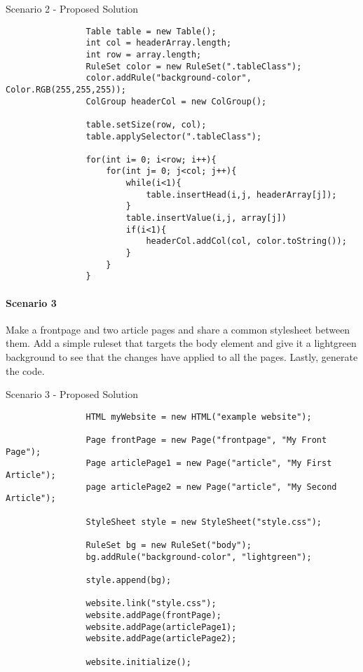 \documentclass[12pt]{article}
\begin{document}
        \begin{shaded}
            Scenario 2 - Proposed Solution
            \begin{lstlisting}
                Table table = new Table();
                int col = headerArray.length;
                int row = array.length;
                RuleSet color = new RuleSet(".tableClass");
                color.addRule("background-color", Color.RGB(255,255,255));
                ColGroup headerCol = new ColGroup();

                table.setSize(row, col);
                table.applySelector(".tableClass");

                for(int i= 0; i<row; i++){
                    for(int j= 0; j<col; j++){
                        while(i<1){
                            table.insertHead(i,j, headerArray[j]);
                        }
                        table.insertValue(i,j, array[j])
                        if(i<1){
                            headerCol.addCol(col, color.toString());
                        }
                    }
                }
            \end{lstlisting}
        \end{shaded}

        \paragraph{Scenario 3}
        Make a frontpage and two article pages and share a common stylesheet between them. Add a simple ruleset that targets the body element and give it a lightgreen background to see that the changes have applied to all the pages. Lastly, generate the code.

        \begin{shaded}
            Scenario 3 - Proposed Solution
            \begin{lstlisting}
                HTML myWebsite = new HTML("example website");
                
                Page frontPage = new Page("frontpage", "My Front Page");
                Page articlePage1 = new Page("article", "My First Article");
                page articlePage2 = new Page("article", "My Second Article");

                StyleSheet style = new StyleSheet("style.css");

                RuleSet bg = new RuleSet("body");
                bg.addRule("background-color", "lightgreen");

                style.append(bg);

                website.link("style.css");
                website.addPage(frontPage);
                website.addPage(articlePage1);
                website.addPage(articlePage2);

                website.initialize();
            \end{lstlisting}
        \end{shaded}
\end{document}
